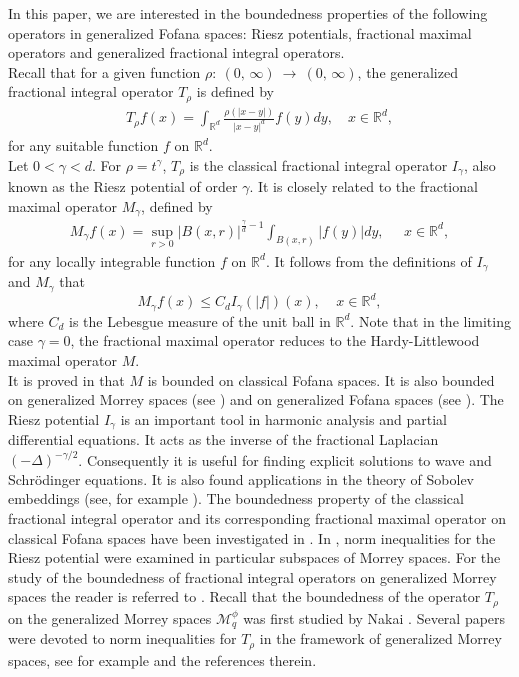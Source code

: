 \documentclass[a4paper,12pt,intlimits,oneside]{amsart}
\numberwithin{equation}{section}
\numberwithin{equation}{section}
\theoremstyle{definition}
\begin{document}
 
 In this paper, we are interested in the boundedness properties of the following operators in generalized Fofana spaces: Riesz potentials, fractional maximal operators and generalized fractional integral operators.\\  
Recall that for a given function $\rho : \: (0,\, \infty) \:  \longrightarrow \: (0,\,\infty)$, the generalized fractional integral operator $ T_{\rho} $ is defined by
\begin{eqnarray*} \label{rel 9}
 T_{\rho} f(x)=\displaystyle\int_{\mathbb{R}^{d}}\frac{\rho(\left|x-y\right|)}{\left|x-y\right|^{d}}f(y)dy,\quad   x \in \mathbb R^ {d},
\end{eqnarray*}
for any suitable function $ f $ on $ \mathbb{R}^{d} $.\\
Let $0 < \gamma < d$. For $\rho = t^{\gamma}$, $T_{\rho}$ is the classical fractional integral operator $I_{\gamma}$, also known as the Riesz potential of order $\gamma$. It is closely related to the fractional maximal operator $M_{\gamma}$, defined by
\begin{eqnarray*} \label{rel 6}
 M_{\gamma} f(x)=\sup_{r>0}\vert B(x,r)\vert^{\frac{\gamma}{d}-1}\displaystyle\int_{B(x,r)}\left|f(y)\right|dy,\;\;\;\;\; x\in \mathbb{R}^{d},
\end{eqnarray*}
for any locally integrable function $f$ on $\mathbb{R}^{d}$. It follows from the definitions of $I_{\gamma}$ and $M_{\gamma}$ that
\begin{equation} \label{rel 11}
M_{\gamma} f(x) \leq C_{d}I_{\gamma} (\vert f \vert)(x),\;\;\;\; x\in \mathbb{R}^{d},
\end{equation}
where $C_{d}$ is the Lebesgue measure of the unit ball in $\mathbb{R}^{d}$.
Note that in the limiting case $\gamma=0$, the fractional maximal operator reduces to the Hardy-Littlewood maximal operator $ M$.\\
It is proved in \cite{JF} that $ M $ is bounded on classical Fofana spaces. It is also bounded on generalized Morrey spaces (see \cite{EN}) and on generalized Fofana spaces (see \cite{NKD}). The Riesz potential $I_{\gamma}$ is an important tool in harmonic analysis and partial differential equations. It acts as the inverse of the fractional Laplacian $(-\Delta)^{-\gamma/2}$. Consequently it is useful for finding explicit solutions to wave and Schr\"odinger equations. It is also found applications in the theory of Sobolev embeddings (see, for example \cite{Ma}). The boundedness property of the classical fractional integral operator and its corresponding fractional maximal operator on classical Fofana spaces have been investigated in \cite{JF, fof, Fof}. In \cite{Fof-F-K}, norm inequalities for the Riesz potential were examined in particular subspaces of Morrey spaces. For the study of the boundedness of fractional integral operators on generalized Morrey spaces the reader is referred to \cite{GE, EN, ST}. Recall that the boundedness of the operator $T_{\rho}$ on the generalized Morrey spaces $\mathcal{M}_{q}^{\phi}$ was first studied by Nakai \cite{EN1}. Several papers were devoted to norm inequalities for $T_{\rho}$ in the framework of generalized Morrey spaces, see for example \cite{GE, S-S-T, Su} and the references therein.
\end{document}

